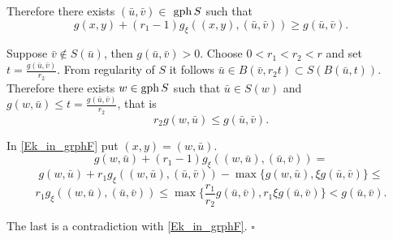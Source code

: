 \documentclass{article}
\def\gph{\mathop{\rm gph}}
\def\gph{\mathop{\rm gph}}
\renewenvironment{proof}
         {\begin{trivlist}\item[
         {\bf Proof.}]}{{\hfill $\square$} \end{trivlist}}
\begin{document}
\begin{proof}
Therefore there exists $(\bar{u},\bar{v}) \in$ $\gph S$ such that \begin{equation} \label{Ek_in_grphF} 
g(x,y)+(r_1-1)g_{\xi}((x,y),(\bar{u},\bar{v})) \geq g(\bar{u},\bar{v}).
\end{equation}

Suppose $\bar{v} \notin S(\bar{u})$, then $g(\bar{u},\bar{v})>0$. Choose $0<r_1<r_2<r$ and set $t=\frac{g(\bar{u},\bar{v})}{r_2}$. From regularity of $S$ it follows $\bar{u} \in B(\bar{v},r_2t) \subset S(B(\bar{u},t))$. Therefore there exists $w \in \gph S$ such that $\bar{u} \in S(w)$ and $
g(w,\bar{u}) \leq t = \frac{g(\bar{u},\bar{v})}{r_2}$, that is 
\[r_2g(w,\bar{u}) \leq g(\bar{u},\bar{v}).\]

In \ref{Ek_in_grphF} put $(x,y)=(w,\bar{u})$.
\[g(w,\bar{u})+(r_1-1)g_{\xi}((w,\bar{u}),(\bar{u},\bar{v})) =\]
\[g(w,\bar{u})+r_1g_{\xi}((w,\bar{u}),(\bar{u},\bar{v}))-\max\{g(w,\bar{u}),\xi g(\bar{u},\bar{v})\} \leq
\]
\[r_1g_{\xi}((w,\bar{u}),(\bar{u},\bar{v})) \leq \max\{\frac{r_1}{r_2}g(\bar{u},\bar{v}),r_1 \xi g(\bar{u},\bar{v})\}<g(\bar{u},\bar{v}).\]

The last is a contradiction with \ref{Ek_in_grphF}.
\end{proof}
\end{document}
